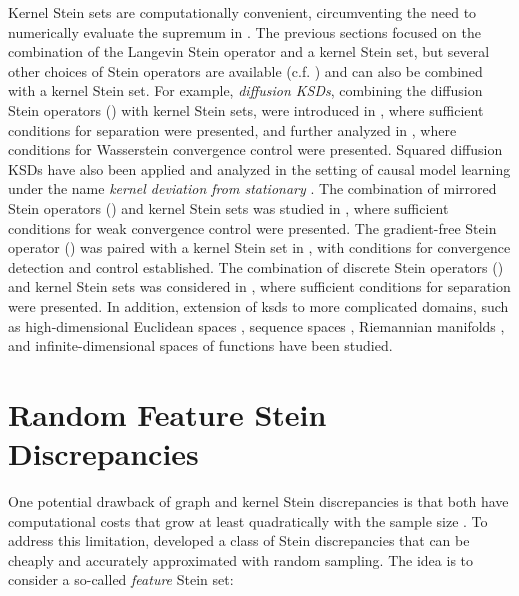 \documentclass[12pt,paper=letter]{scrreprt}
\begin{document}
Kernel Stein sets are computationally convenient, circumventing the need to numerically evaluate the supremum in . 
The previous sections focused on the combination of the Langevin Stein operator and a kernel Stein set, but several other choices of Stein operators are available (c.f. ) and can also be combined with a kernel Stein set. 
For example, \emph{diffusion KSDs},  combining the diffusion Stein operators () with kernel Stein sets, were introduced in \citet{barp2019minimum}, where sufficient conditions for separation were presented, and further analyzed in \citet{kanagawa2022controlling}, where conditions for Wasserstein convergence control were presented. Squared diffusion KSDs have also been applied and analyzed in the setting of causal model learning under the name \emph{kernel deviation from stationary} \citep{lorch2024causal,bleile2026efficient}.
The combination of mirrored Stein operators () and kernel Stein sets was studied in \citet{shi2022sampling}, where sufficient conditions for weak convergence control were presented.
The gradient-free Stein operator () was paired with a kernel Stein set in \citet{fisher2023gradient}, with conditions for convergence detection and control established.
The combination of discrete Stein operators () and kernel Stein sets was considered in \citet{yang2018goodness}, where sufficient conditions for separation were presented.
In addition, extension of \acp{ksd} to more complicated domains, such as high-dimensional Euclidean spaces \citep{gongsliced}, sequence spaces \citep{baum2023kernel}, Riemannian manifolds \citep{xu2020stein,barp2022riemann}, and infinite-dimensional spaces of functions \citep{wynne2022kernel} have been studied.









\section{Random Feature Stein Discrepancies}
\label{sec: rfsd}

One potential drawback of graph and kernel Stein discrepancies is that both have computational costs that grow at least quadratically with the sample size \citep{gorham2017measuring}.
To address this limitation, \citet{huggins2018random} developed a class of Stein discrepancies that can be cheaply and accurately approximated with random sampling.
The idea is to consider a so-called \emph{feature} Stein set:
\end{document}
